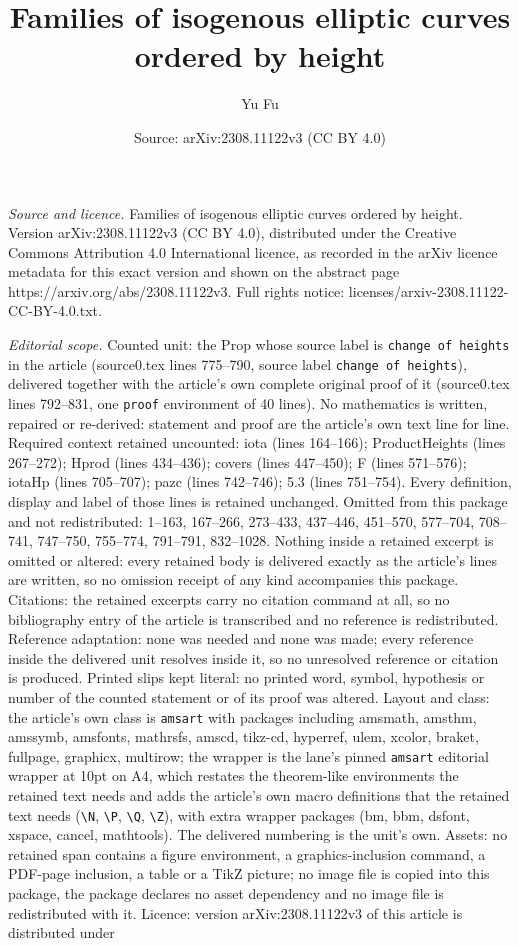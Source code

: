 \documentclass[10pt,a4paper]{amsart}
\title[Families of isogenous elliptic curves ordered by height]{Families of isogenous elliptic curves ordered by height}
\author{Yu Fu}
\date{Source: arXiv:2308.11122v3 (CC BY 4.0)}
\begin{document}
\maketitle

\noindent\emph{Source and licence.} Families of isogenous elliptic curves ordered by height. Version arXiv:2308.11122v3 (CC BY 4.0), distributed under the Creative Commons Attribution 4.0 International licence, as recorded in the arXiv licence metadata for this exact version and shown on the abstract page https://arxiv.org/abs/2308.11122v3. Full rights notice: licenses/arxiv-2308.11122-CC-BY-4.0.txt.\par\smallskip

\noindent\textit{Editorial scope.} Counted unit: the Prop whose source label is \texttt{change of heights} in the article (source0.tex lines 775--790, source label \texttt{change of heights}), delivered together with the article's own complete original proof of it (source0.tex lines 792--831, one \texttt{proof} environment of 40 lines). No mathematics is written, repaired or re-derived: statement and proof are the article's own text line for line. Required context retained uncounted: iota (lines 164--166); ProductHeights (lines 267--272); Hprod (lines 434--436); covers (lines 447--450); F (lines 571--576); iotaHp (lines 705--707); pazc (lines 742--746); 5.3 (lines 751--754). Every definition, display and label of those lines is retained unchanged. Omitted from this package and not redistributed: 1--163, 167--266, 273--433, 437--446, 451--570, 577--704, 708--741, 747--750, 755--774, 791--791, 832--1028. Nothing inside a retained excerpt is omitted or altered: every retained body is delivered exactly as the article's lines are written, so no omission receipt of any kind accompanies this package. Citations: the retained excerpts carry no citation command at all, so no bibliography entry of the article is transcribed and no reference is redistributed. Reference adaptation: none was needed and none was made; every reference inside the delivered unit resolves inside it, so no unresolved reference or citation is produced. Printed slips kept literal: no printed word, symbol, hypothesis or number of the counted statement or of its proof was altered. Layout and class: the article's own class is \texttt{amsart} with packages including amsmath, amsthm, amssymb, amsfonts, mathrsfs, amscd, tikz-cd, hyperref, ulem, xcolor, braket, fullpage, graphicx, multirow; the wrapper is the lane's pinned \texttt{amsart} editorial wrapper at 10pt on A4, which restates the theorem-like environments the retained text needs and adds the article's own macro definitions that the retained text needs (\texttt{\textbackslash N}, \texttt{\textbackslash P}, \texttt{\textbackslash Q}, \texttt{\textbackslash Z}), with extra wrapper packages (bm, bbm, dsfont, xspace, cancel, mathtools). The delivered numbering is the unit's own. Assets: no retained span contains a figure environment, a graphics-inclusion command, a PDF-page inclusion, a table or a TikZ picture; no image file is copied into this package, the package declares no asset dependency and no image file is redistributed with it. Licence: version arXiv:2308.11122v3 of this article is distributed under 
\end{document}

